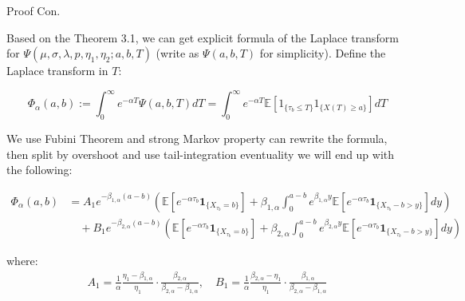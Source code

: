 \documentclass{beamer}
\begin{document}
\begin{frame}{Proof Con.}

    
    {\footnotesize \footnotesize
    \par Based on the Theorem 3.1, we can get explicit formula of the Laplace transform 
    for $\Psi(\mu, \sigma, \lambda, p, \eta_1, \eta_2; a, b, T)$ (write as $\Psi(a, b, T)$ for simplicity). Define the Laplace transform in \( T \):

    \[
    \Phi_\alpha(a, b) := \int_0^\infty e^{-\alpha T} \Psi(a, b, T)  dT = 
    \int_0^\infty e^{-\alpha T} \mathbb{E}[1_{\{\tau_b \leq T\}} 1_{\{X(T) \geq a\}}]  dT
    \]

    \par  \pause We use Fubini Theorem and strong Markov property can rewrite the formula, then split by overshoot and use tail-integration eventuality
    we will end up with the following:
    {\footnotesize \tiny
    \begin{align*}
        \Phi_\alpha(a,b) &= A_1 e^{-\beta_{1,\alpha}(a-b)} \left( \mathbb{E} \left[ e^{-\alpha\tau_b} \mathbf{1}_{\{X_{\tau_b}=b\}} \right] +
         \beta_{1,\alpha} \int_0^{a-b} e^{\beta_{1,\alpha}y} \mathbb{E} \left[ e^{-\alpha\tau_b} \mathbf{1}_{\{X_{\tau_b}-b>y\}} \right] dy \right) \\
        &\quad + B_1 e^{-\beta_{2,\alpha}(a-b)} \left( \mathbb{E} \left[ e^{-\alpha\tau_b} \mathbf{1}_{\{X_{\tau_b}=b\}} \right]
        + \beta_{2,\alpha} \int_0^{a-b} e^{\beta_{2,\alpha}y} \mathbb{E} \left[ e^{-\alpha\tau_b} \mathbf{1}_{\{X_{\tau_b}-b>y\}} \right] dy \right)
    \end{align*}
    

    }
    \par where:
    {\footnotesize \tiny
    \begin{align*}
        A_1 = \frac{1}{\alpha} \frac{\eta_1 - \beta_{1,\alpha}}{\eta_1} \cdot \frac{\beta_{2,\alpha}}{\beta_{2,\alpha} - \beta_{1,\alpha}}, 
        \quad B_1 = \frac{1}{\alpha} \frac{\beta_{2,\alpha} - \eta_1}{\eta_1} \cdot \frac{\beta_{1,\alpha}}{\beta_{2,\alpha} - \beta_{1,\alpha}}
    \end{align*}
    }
    }
    
\end{frame}
\end{document}
